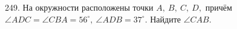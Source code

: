 249. На окружности расположены точки $A,\ B,\ C,\ D,$ причём $\angle ADC=\angle CBA=56^\circ,\
\angle ADB=37^\circ.$ Найдите $\angle CAB.$\\
